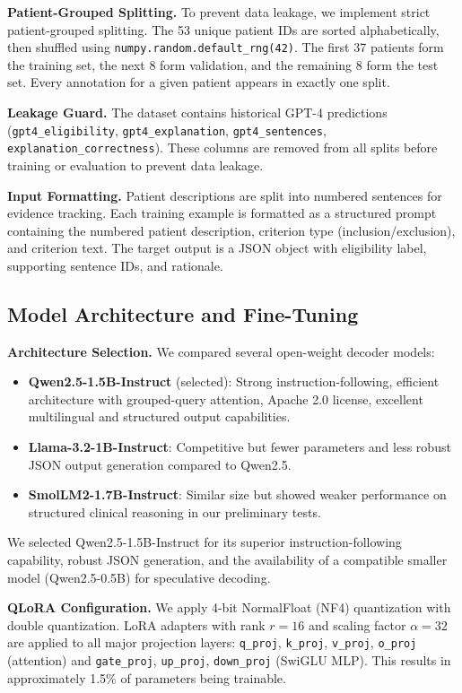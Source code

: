 \documentclass[conference]{IEEEtran}
\begin{document}
\textbf{Patient-Grouped Splitting.} To prevent data leakage, we implement strict patient-grouped splitting. The 53 unique patient IDs are sorted alphabetically, then shuffled using \texttt{numpy.random.default\_rng(42)}. The first 37 patients form the training set, the next 8 form validation, and the remaining 8 form the test set. Every annotation for a given patient appears in exactly one split.

\textbf{Leakage Guard.} The dataset contains historical GPT-4 predictions (\texttt{gpt4\_eligibility}, \texttt{gpt4\_explanation}, \texttt{gpt4\_sentences}, \texttt{explanation\_correctness}). These columns are removed from all splits before training or evaluation to prevent data leakage.

\textbf{Input Formatting.} Patient descriptions are split into numbered sentences for evidence tracking. Each training example is formatted as a structured prompt containing the numbered patient description, criterion type (inclusion/exclusion), and criterion text. The target output is a JSON object with eligibility label, supporting sentence IDs, and rationale.

\subsection{Model Architecture and Fine-Tuning}

\textbf{Architecture Selection.} We compared several open-weight decoder models:

\begin{itemize}
\item \textbf{Qwen2.5-1.5B-Instruct} (selected): Strong instruction-following, efficient architecture with grouped-query attention, Apache 2.0 license, excellent multilingual and structured output capabilities.
\item \textbf{Llama-3.2-1B-Instruct}: Competitive but fewer parameters and less robust JSON output generation compared to Qwen2.5.
\item \textbf{SmolLM2-1.7B-Instruct}: Similar size but showed weaker performance on structured clinical reasoning in our preliminary tests.
\end{itemize}

We selected Qwen2.5-1.5B-Instruct for its superior instruction-following capability, robust JSON generation, and the availability of a compatible smaller model (Qwen2.5-0.5B) for speculative decoding.

\textbf{QLoRA Configuration.} We apply 4-bit NormalFloat (NF4) quantization with double quantization. LoRA adapters with rank $r=16$ and scaling factor $\alpha=32$ are applied to all major projection layers: \texttt{q\_proj}, \texttt{k\_proj}, \texttt{v\_proj}, \texttt{o\_proj} (attention) and \texttt{gate\_proj}, \texttt{up\_proj}, \texttt{down\_proj} (SwiGLU MLP). This results in approximately 1.5\% of parameters being trainable.
\end{document}
